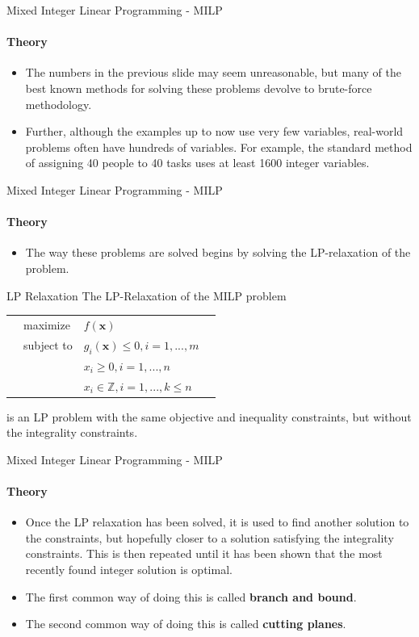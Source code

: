 \documentclass{beamer}
\renewcommand{\vec}{\mathbf}
\begin{document}
	\begin{frame}{Mixed Integer Linear Programming - MILP}
		\framesubtitle{Theory}
		\begin{itemize}
			\item The numbers in the previous slide may seem unreasonable, but many of the best known methods for solving these problems devolve to brute-force methodology. 
			\item Further, although the examples up to now use very few variables, real-world problems often have hundreds of variables. For example, the standard method of assigning 40 people to 40 tasks uses at least 1600 integer variables.
		\end{itemize}
	\end{frame}
	
	\begin{frame}{Mixed Integer Linear Programming - MILP}
		\framesubtitle{Theory}
		\begin{itemize}
			\item The way these problems are solved begins by solving the LP-relaxation of the problem.
		\end{itemize}
		\begin{block}{LP Relaxation}
			The LP-Relaxation of the MILP problem 
			\begin{tabularx}{\textwidth}{X l l X}
				& maximize		& $f(\vec{x})$		& \\
				& subject to	& $g_i(\vec{x}) \leq 0, i=1,...,m$	& \\
				& 				& $x_i \geq 0, i=1,...,n$ & \\
				& 				& $x_i\in\mathbb{Z}, i=1,...,k\leq n$ &
			\end{tabularx}
			is an LP problem with the same objective and inequality constraints, but without the integrality constraints.
		\end{block}
	\end{frame}

	\begin{frame}{Mixed Integer Linear Programming - MILP}
		\framesubtitle{Theory}
		\begin{itemize}
			\item Once the LP relaxation has been solved, it is used to find another solution to the constraints, but hopefully closer to a solution satisfying the integrality constraints. This is then repeated until it has been shown that the most recently found integer solution is optimal.
			\item The first common way of doing this is called \textbf{branch and bound}.
			\item The second common way of doing this is called \textbf{cutting planes}.
		\end{itemize}
	\end{frame}
\end{document}
